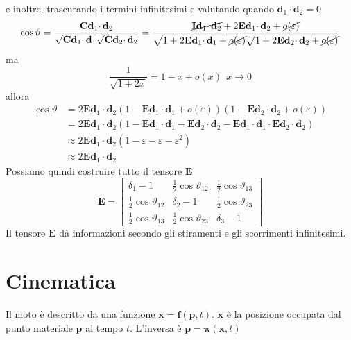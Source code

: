 \documentclass[10pt,a4paper,twoside]{book}
\begin{document}
e inoltre, trascurando i termini infinitesimi e valutando quando $\mathbf{d}_{1} \cdotp \mathbf{d}_{2} =0$
\begin{equation*}
\cos \vartheta =\frac{\mathbf{Cd}_{1} \cdotp \mathbf{d}_{2}}{\sqrt{\mathbf{Cd}_{1} \cdotp \mathbf{d}_{1}}\sqrt{\mathbf{Cd}_{2} \cdotp \mathbf{d}_{2}}} =\frac{\cancel{\mathbf{Id}_{1} \cdotp \mathbf{d}_{2}} +2\mathbf{Ed}_{1} \cdotp \mathbf{d}_{2} +\cancel{o( \varepsilon )}}{\sqrt{1+2\mathbf{Ed}_{1} \cdotp \mathbf{d}_{1} +\cancel{o( \varepsilon )}}\sqrt{1+2\mathbf{Ed}_{2} \cdotp \mathbf{d}_{2} +\cancel{o( \varepsilon )}}}
\end{equation*}
ma
\begin{equation*}
\frac{1}{\sqrt{1+2x}} =1-x+o( x) \ \ x\rightarrow 0
\end{equation*}
allora
\begin{align*}
\cos \vartheta  & =2\mathbf{Ed}_{1} \cdotp \mathbf{d}_{2}( 1-\mathbf{Ed}_{1} \cdotp \mathbf{d}_{1} +o( \varepsilon ))( 1-\mathbf{Ed}_{2} \cdotp \mathbf{d}_{2} +o( \varepsilon ))\\
 & =2\mathbf{Ed}_{1} \cdotp \mathbf{d}_{2}( 1-\mathbf{Ed}_{1} \cdotp \mathbf{d}_{1} -\mathbf{Ed}_{2} \cdotp \mathbf{d}_{2} -\mathbf{Ed}_{1} \cdotp \mathbf{d}_{1} \cdotp \mathbf{Ed}_{2} \cdotp \mathbf{d}_{2})\\
 & \approx 2\mathbf{Ed}_{1} \cdotp \mathbf{d}_{2}\left( 1-\varepsilon -\varepsilon -\varepsilon ^{2}\right)\\
 & \approx 2\mathbf{Ed}_{1} \cdotp \mathbf{d}_{2}
\end{align*}
Possiamo quindi costruire tutto il tensore $\mathbf{E}$
\begin{equation*}
\mathbf{E} =\begin{bmatrix}
\delta _{1} -1 & \frac{1}{2}\cos \vartheta _{12} & \frac{1}{2}\cos \vartheta _{13}\\
\frac{1}{2}\cos \vartheta _{12} & \delta _{2} -1 & \frac{1}{2}\cos \vartheta _{23}\\
\frac{1}{2}\cos \vartheta _{13} & \frac{1}{2}\cos \vartheta _{23} & \delta _{3} -1
\end{bmatrix}
\end{equation*}
Il tensore $\mathbf{E}$ dà informazioni secondo gli stiramenti e gli scorrimenti infinitesimi.
\chapter{Cinematica}

Il moto è descritto da una funzione $\mathbf{x} =\mathbf{f}(\mathbf{p} ,t)$. $\mathbf{x}$ è la posizione occupata dal punto materiale $\mathbf{p}$ al tempo $t$. L'inversa è $\mathbf{p} =\mathbf{\pi }(\mathbf{x} ,t)$
\end{document}
